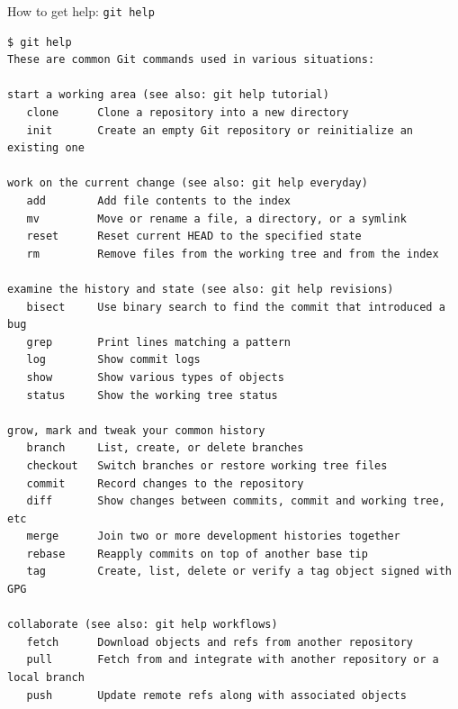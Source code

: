 \documentclass[svgnames]{beamer}
\begin{document}
\begin{frame}[fragile]{How to get help: \texttt{git help}}
 \begin{lstlisting}[basicstyle={\ttfamily\tiny}]
$ git help
These are common Git commands used in various situations:

start a working area (see also: git help tutorial)
   clone      Clone a repository into a new directory
   init       Create an empty Git repository or reinitialize an existing one

work on the current change (see also: git help everyday)
   add        Add file contents to the index
   mv         Move or rename a file, a directory, or a symlink
   reset      Reset current HEAD to the specified state
   rm         Remove files from the working tree and from the index

examine the history and state (see also: git help revisions)
   bisect     Use binary search to find the commit that introduced a bug
   grep       Print lines matching a pattern
   log        Show commit logs
   show       Show various types of objects
   status     Show the working tree status

grow, mark and tweak your common history
   branch     List, create, or delete branches
   checkout   Switch branches or restore working tree files
   commit     Record changes to the repository
   diff       Show changes between commits, commit and working tree, etc
   merge      Join two or more development histories together
   rebase     Reapply commits on top of another base tip
   tag        Create, list, delete or verify a tag object signed with GPG

collaborate (see also: git help workflows)
   fetch      Download objects and refs from another repository
   pull       Fetch from and integrate with another repository or a local branch
   push       Update remote refs along with associated objects
 \end{lstlisting}
\end{frame}
\end{document}
